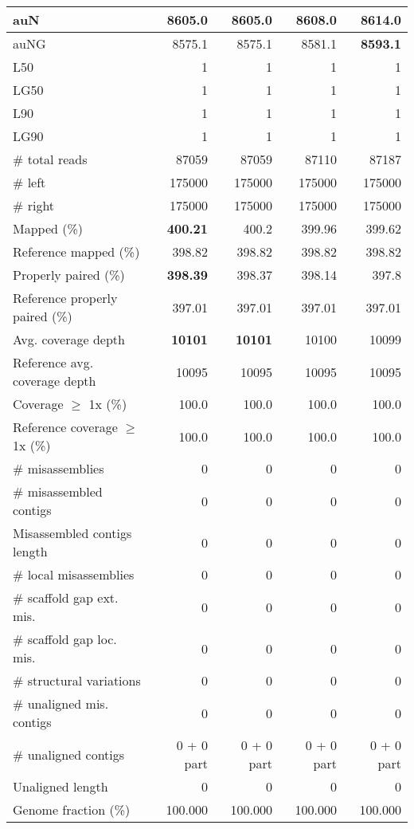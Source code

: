 \documentclass[12pt,a4paper]{article}
\begin{document}
\begin{table}[ht]
\begin{center}
\begin{tabular}{|l*{4}{|r}|}
auN & 8605.0 & 8605.0 & 8608.0 & {\bf 8614.0} \\ \hline
auNG & 8575.1 & 8575.1 & 8581.1 & {\bf 8593.1} \\ \hline
L50 & 1 & 1 & 1 & 1 \\ \hline
LG50 & 1 & 1 & 1 & 1 \\ \hline
L90 & 1 & 1 & 1 & 1 \\ \hline
LG90 & 1 & 1 & 1 & 1 \\ \hline
\# total reads & 87059 & 87059 & 87110 & 87187 \\ \hline
\# left & 175000 & 175000 & 175000 & 175000 \\ \hline
\# right & 175000 & 175000 & 175000 & 175000 \\ \hline
Mapped (\%) & {\bf 400.21} & 400.2 & 399.96 & 399.62 \\ \hline
Reference mapped (\%) & 398.82 & 398.82 & 398.82 & 398.82 \\ \hline
Properly paired (\%) & {\bf 398.39} & 398.37 & 398.14 & 397.8 \\ \hline
Reference properly paired (\%) & 397.01 & 397.01 & 397.01 & 397.01 \\ \hline
Avg. coverage depth & {\bf 10101} & {\bf 10101} & 10100 & 10099 \\ \hline
Reference avg. coverage depth & 10095 & 10095 & 10095 & 10095 \\ \hline
Coverage $\geq$ 1x (\%) & 100.0 & 100.0 & 100.0 & 100.0 \\ \hline
Reference coverage $\geq$ 1x (\%) & 100.0 & 100.0 & 100.0 & 100.0 \\ \hline
\# misassemblies & 0 & 0 & 0 & 0 \\ \hline
\# misassembled contigs & 0 & 0 & 0 & 0 \\ \hline
Misassembled contigs length & 0 & 0 & 0 & 0 \\ \hline
\# local misassemblies & 0 & 0 & 0 & 0 \\ \hline
\# scaffold gap ext. mis. & 0 & 0 & 0 & 0 \\ \hline
\# scaffold gap loc. mis. & 0 & 0 & 0 & 0 \\ \hline
\# structural variations & 0 & 0 & 0 & 0 \\ \hline
\# unaligned mis. contigs & 0 & 0 & 0 & 0 \\ \hline
\# unaligned contigs & 0 + 0 part & 0 + 0 part & 0 + 0 part & 0 + 0 part \\ \hline
Unaligned length & 0 & 0 & 0 & 0 \\ \hline
Genome fraction (\%) & 100.000 & 100.000 & 100.000 & 100.000 \\ \hline

\end{tabular}
\end{center}
\end{table}
\end{document}
